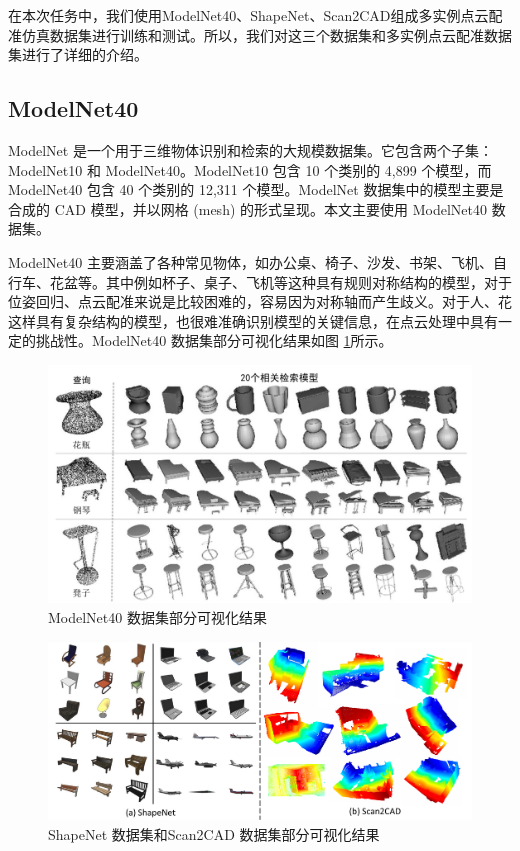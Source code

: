 在本次任务中，我们使用ModelNet40、ShapeNet、Scan2CAD组成多实例点云配准仿真数据集进行训练和测试。所以，我们对这三个数据集和多实例点云配准数据集进行了详细的介绍。

\subsection{ModelNet40}
ModelNet 是一个用于三维物体识别和检索的大规模数据集。它包含两个子集：ModelNet10 和 ModelNet40。ModelNet10 包含 10 个类别的 4,899 个模型，而 ModelNet40 包含 40 个类别的 12,311 个模型。ModelNet 数据集中的模型主要是合成的 CAD 模型，并以网格 (mesh) 的形式呈现。本文主要使用 ModelNet40 数据集。 

ModelNet40 主要涵盖了各种常见物体，如办公桌、椅子、沙发、书架、飞机、自行车、花盆等。其中例如杯子、桌子、飞机等这种具有规则对称结构的模型，对于位姿回归、点云配准来说是比较困难的，容易因为对称轴而产生歧义。对于人、花这样具有复杂结构的模型，也很难准确识别模型的关键信息，在点云处理中具有一定的挑战性。ModelNet40 数据集部分可视化结果如图 \ref{fig:modelnet}所示。

\begin{figure}
    \centering
    \includegraphics[width=\textwidth]{images/ModelNet.pdf}
    \caption{ModelNet40 数据集部分可视化结果}
    \label{fig:modelnet}
    \vspace{-0.5cm}
\end{figure}

\begin{figure}
    \centering
    \includegraphics[width=\textwidth]{images/Shapenet-Scan2CAD.pdf}
    \caption{ShapeNet 数据集和Scan2CAD 数据集部分可视化结果}
    \label{fig:ShapeNet&Scan2CAD}
    \vspace{-0.5cm}
\end{figure}
